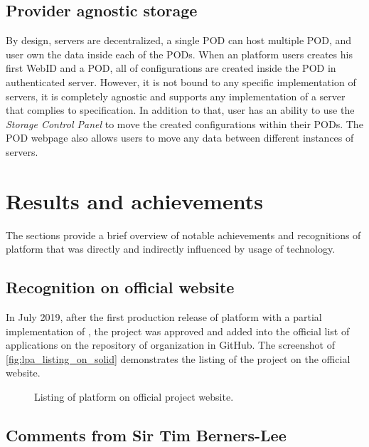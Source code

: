\subsection{Provider agnostic storage}

By design, \solid{} servers are decentralized, a single \solid{} POD can host multiple \solid{} POD, and user own the data inside each of the PODs. When an \lpa{} platform users creates his first WebID and a \solid{} POD, all of \lpa{} configurations are created inside the \solid{} POD in authenticated \solid{} server. However, it is not bound to any specific implementation of \solid{} servers, it is completely agnostic and supports any implementation of a server that complies to \solid{} specification. In addition to that, user has an ability to use the \textit{Storage Control Panel} to move the created configurations within their PODs. The \solid{} POD webpage also allows users to move any data between different instances of \solid{} servers.

\section{Results and achievements}

The sections provide a brief overview of notable achievements and recognitions of \lpa{} platform that was directly and indirectly influenced by usage of \solid{} technology. 

\subsection{Recognition on official \solid{} website}
\label{sssec:recogniition_on_solid}

In July 2019, after the first production release of \lpa{} platform with a partial implementation of \lpas{}, the project was approved and added into the official list of \solid{} applications on the repository of \solid{} organization in GitHub. The screenshot of \autoref{fig:lpa_listing_on_solid} demonstrates the listing of the project on the official website.

\begin{figure}[h]
\centering
{}
\caption{Listing of \lpa{} platform on official \solid{} project website.}
\label{fig:lpa_listing_on_solid}
\end{figure}

\subsection{Comments from Sir Tim Berners-Lee}
\label{sssec:comments_from_tim}

